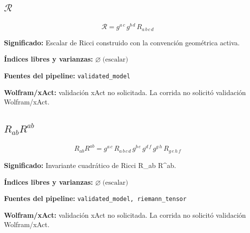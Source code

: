 \documentclass[11pt]{article}
\begin{document}
\subsection*{$ \mathcal{R} $}
\begin{dmath*}[breakdepth={5}]
\mathcal{R} = g{}^{a\,c}\,g{}^{b\,d}\,R{}_{a\,b\,c\,d}
\end{dmath*}
\par\vspace{1.2\baselineskip}\noindent
\begin{minipage}{\linewidth}
\textbf{Significado:} Escalar de Ricci construido con la convención geométrica activa.\par
\textbf{Índices libres y varianzas:} $ \varnothing\;\text{(escalar)} $\par
\textbf{Fuentes del pipeline:} \texttt{validated\_model}\par
\textbf{Wolfram/xAct:} validación xAct no solicitada. La corrida no solicitó validación Wolfram/xAct.\par
\end{minipage}
\subsection*{$ R_{ab}R^{ab} $}
\begin{dmath*}[breakdepth={5}]
R_{ab}R^{ab} = g{}^{a\,c}\,R{}_{a\,b\,c\,d}\,g{}^{b\,e}\,g{}^{d\,f}\,g{}^{g\,h}\,R{}_{g\,e\,h\,f}
\end{dmath*}
\par\vspace{1.2\baselineskip}\noindent
\begin{minipage}{\linewidth}
\textbf{Significado:} Invariante cuadrático de Ricci R\_ab R^ab.\par
\textbf{Índices libres y varianzas:} $ \varnothing\;\text{(escalar)} $\par
\textbf{Fuentes del pipeline:} \texttt{validated\_model, riemann\_tensor}\par
\textbf{Wolfram/xAct:} validación xAct no solicitada. La corrida no solicitó validación Wolfram/xAct.\par
\end{minipage}
\end{document}
